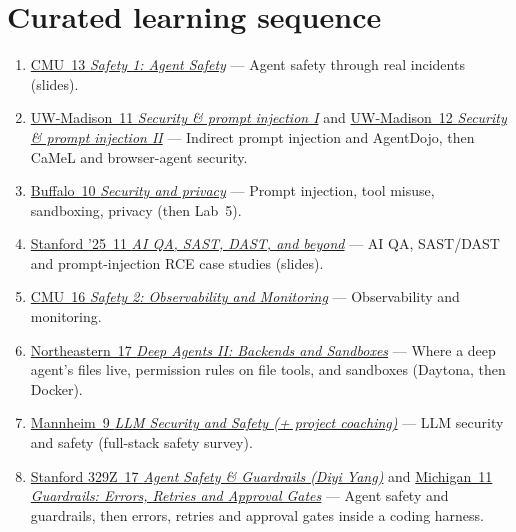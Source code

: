\documentclass[10pt,oneside]{report}
\begin{document}
\section{Curated learning sequence}
\begin{enumerate}
\item \hyperlink{lec-CMU-13}{CMU~13 \emph{Safety 1: Agent Safety}} --- Agent safety through real incidents (slides).
\item \hyperlink{lec-UW-11}{UW-Madison~11 \emph{Security \& prompt injection I}} and \hyperlink{lec-UW-12}{UW-Madison~12 \emph{Security \& prompt injection II}} --- Indirect prompt injection and AgentDojo, then CaMeL and browser-agent security.
\item \hyperlink{lec-UB-10}{Buffalo~10 \emph{Security and privacy}} --- Prompt injection, tool misuse, sandboxing, privacy (then Lab~5).
\item \hyperlink{lec-STAN25-11}{Stanford '25~11 \emph{AI QA, SAST, DAST, and beyond}} --- AI QA, SAST/DAST and prompt-injection RCE case studies (slides).
\item \hyperlink{lec-CMU-16}{CMU~16 \emph{Safety 2: Observability and Monitoring}} --- Observability and monitoring.
\item \hyperlink{lec-NEU-17}{Northeastern~17 \emph{Deep Agents II: Backends and Sandboxes}} --- Where a deep agent's files live, permission rules on file tools, and sandboxes (Daytona, then Docker).
\item \hyperlink{lec-MANN-9}{Mannheim~9 \emph{LLM Security and Safety (+ project coaching)}} --- LLM security and safety (full-stack safety survey).
\item \hyperlink{lec-S329Z-17}{Stanford 329Z~17 \emph{Agent Safety \& Guardrails (Diyi Yang)}} and \hyperlink{lec-UMICH-11}{Michigan~11 \emph{Guardrails: Errors, Retries and Approval Gates}} --- Agent safety and guardrails, then errors, retries and approval gates inside a coding harness.
\end{enumerate}
\end{document}
